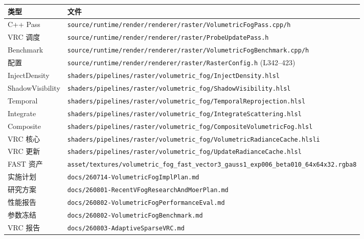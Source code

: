 \documentclass[11pt,a4paper]{article}
\begin{document}
\begin{longtable}{lp{8cm}}
\toprule
\textbf{类型} & \textbf{文件} \\
\midrule
\endhead
C++ Pass & \texttt{source/runtime/render/renderer/raster/VolumetricFogPass.cpp/h} \\
VRC 调度 & \texttt{source/runtime/render/renderer/raster/ProbeUpdatePass.h} \\
Benchmark & \texttt{source/runtime/render/renderer/raster/VolumetricFogBenchmark.cpp/h} \\
配置 & \texttt{source/runtime/render/renderer/raster/RasterConfig.h} (L342--423) \\
\midrule
InjectDensity & \texttt{shaders/pipelines/raster/volumetric\_fog/InjectDensity.hlsl} \\
ShadowVisibility & \texttt{shaders/pipelines/raster/volumetric\_fog/ShadowVisibility.hlsl} \\
Temporal & \texttt{shaders/pipelines/raster/volumetric\_fog/TemporalReprojection.hlsl} \\
Integrate & \texttt{shaders/pipelines/raster/volumetric\_fog/IntegrateScattering.hlsl} \\
Composite & \texttt{shaders/pipelines/raster/volumetric\_fog/CompositeVolumetricFog.hlsl} \\
VRC 核心 & \texttt{shaders/pipelines/raster/volumetric\_fog/VolumetricRadianceCache.hlsli} \\
VRC 更新 & \texttt{shaders/pipelines/raster/volumetric\_fog/UpdateRadianceCache.hlsl} \\
\midrule
FAST 资产 & \texttt{asset/textures/volumetric\_fog\_fast\_vector3\_gauss1\_exp006\_beta010\_64x64x32.rgba8} \\
\midrule
实施计划 & \texttt{docs/260714-VolumetricFogImplPlan.md} \\
研究方案 & \texttt{docs/260801-RecentVFogResearchAndMoerPlan.md} \\
性能报告 & \texttt{docs/260802-VolumetricFogPerformanceEval.md} \\
参数冻结 & \texttt{docs/260802-VolumetricFogBenchmark.md} \\
VRC 报告 & \texttt{docs/260803-AdaptiveSparseVRC.md} \\
\bottomrule
\end{longtable}
\end{document}
